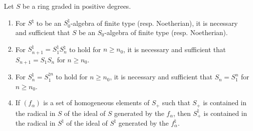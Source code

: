\begin{lemma}[8.2.10]
\label{II.8.2.10}
Let $S$ be a ring graded in positive degrees.
\begin{enumerate}
\item[\rm(i)] For $S^\natural$ to be an $S_0^\natural$-algebra of finite
type (resp. Noetherian), it is necessary and sufficient that $S$ be an $S_0$-algebra
of finite type (resp. Noetherian).
\item[\rm(ii)] For $S_{n+1}^\natural=S_1^\natural S_n^\natural$ to hold for
$n\geq n_0$, it is necessary and sufficient that $S_{n+1}=S_1S_n$ for $n\geq n_0$.
\item[\rm(iii)] For $S_n^\natural=S_1^{\natural n}$ to hold for $n\geq n_0$, it
is necessary and sufficient that $S_n=S_1^n$ for $n\geq n_0$.
\item[\rm(iv)] If $(f_\alpha)$ is a set of homogeneous elements of $S_+$
such that $S_+$ is contained in the radical in $S$ of the ideal of $S$ generated by
the $f_\alpha$, then $S_+^\natural$ is contained in the radical in $S^\natural$ of
the ideal of $S^\natural$ generated by the $f_\alpha^\natural$.
\end{enumerate}
\end{lemma}

